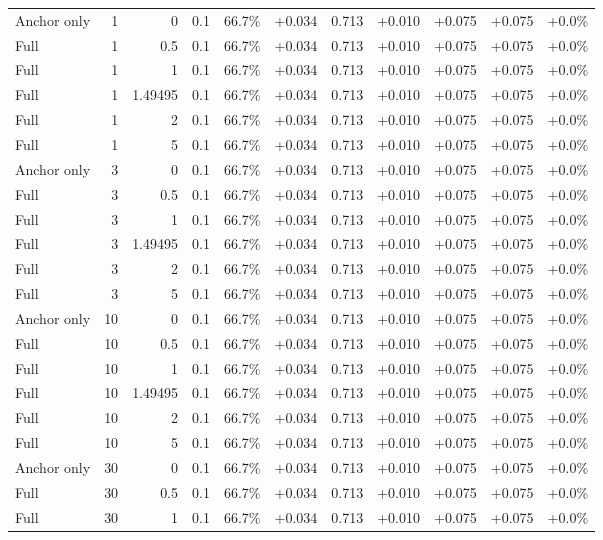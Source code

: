 \begin{table}[htbp]
\begin{tabular}{lrrrccccccc}
Anchor only & 1 & 0 & 0.1 & 66.7\% & +0.034 & 0.713 & +0.010 & +0.075 & +0.075 & +0.0\% \\
Full & 1 & 0.5 & 0.1 & 66.7\% & +0.034 & 0.713 & +0.010 & +0.075 & +0.075 & +0.0\% \\
Full & 1 & 1 & 0.1 & 66.7\% & +0.034 & 0.713 & +0.010 & +0.075 & +0.075 & +0.0\% \\
Full & 1 & 1.49495 & 0.1 & 66.7\% & +0.034 & 0.713 & +0.010 & +0.075 & +0.075 & +0.0\% \\
Full & 1 & 2 & 0.1 & 66.7\% & +0.034 & 0.713 & +0.010 & +0.075 & +0.075 & +0.0\% \\
Full & 1 & 5 & 0.1 & 66.7\% & +0.034 & 0.713 & +0.010 & +0.075 & +0.075 & +0.0\% \\
Anchor only & 3 & 0 & 0.1 & 66.7\% & +0.034 & 0.713 & +0.010 & +0.075 & +0.075 & +0.0\% \\
Full & 3 & 0.5 & 0.1 & 66.7\% & +0.034 & 0.713 & +0.010 & +0.075 & +0.075 & +0.0\% \\
Full & 3 & 1 & 0.1 & 66.7\% & +0.034 & 0.713 & +0.010 & +0.075 & +0.075 & +0.0\% \\
Full & 3 & 1.49495 & 0.1 & 66.7\% & +0.034 & 0.713 & +0.010 & +0.075 & +0.075 & +0.0\% \\
Full & 3 & 2 & 0.1 & 66.7\% & +0.034 & 0.713 & +0.010 & +0.075 & +0.075 & +0.0\% \\
Full & 3 & 5 & 0.1 & 66.7\% & +0.034 & 0.713 & +0.010 & +0.075 & +0.075 & +0.0\% \\
Anchor only & 10 & 0 & 0.1 & 66.7\% & +0.034 & 0.713 & +0.010 & +0.075 & +0.075 & +0.0\% \\
Full & 10 & 0.5 & 0.1 & 66.7\% & +0.034 & 0.713 & +0.010 & +0.075 & +0.075 & +0.0\% \\
Full & 10 & 1 & 0.1 & 66.7\% & +0.034 & 0.713 & +0.010 & +0.075 & +0.075 & +0.0\% \\
Full & 10 & 1.49495 & 0.1 & 66.7\% & +0.034 & 0.713 & +0.010 & +0.075 & +0.075 & +0.0\% \\
Full & 10 & 2 & 0.1 & 66.7\% & +0.034 & 0.713 & +0.010 & +0.075 & +0.075 & +0.0\% \\
Full & 10 & 5 & 0.1 & 66.7\% & +0.034 & 0.713 & +0.010 & +0.075 & +0.075 & +0.0\% \\
Anchor only & 30 & 0 & 0.1 & 66.7\% & +0.034 & 0.713 & +0.010 & +0.075 & +0.075 & +0.0\% \\
Full & 30 & 0.5 & 0.1 & 66.7\% & +0.034 & 0.713 & +0.010 & +0.075 & +0.075 & +0.0\% \\
Full & 30 & 1 & 0.1 & 66.7\% & +0.034 & 0.713 & +0.010 & +0.075 & +0.075 & +0.0\% \\

\end{tabular}
\end{table}
